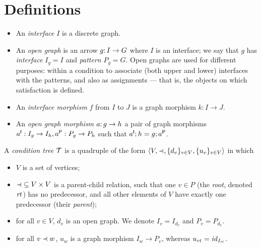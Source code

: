 \section{Definitions}
\label{sec:definitions}

\begin{itemize}
\item An \emph{interface} $I$ is a discrete graph.

\item An \emph{open graph} is an arrow $g{:}\, I\rightarrow G$ where $I$ is an interface; we say that $g$ has \emph{interface} $I_g=I$ and \emph{pattern} $P_g=G$. Open graphs are used for different purposes: within a condition to associate (both upper and lower) interfaces with the patterns, and also as assignments --- that is, the objects on which satisfaction is defined.

\item An \emph{interface morphism} $f$ from $I$ to $J$ is a graph morphism $k:I\to J$.

\item An \emph{open graph morphism} $a{:}\, g\rightarrow h$ a pair of graph morphisms $a^{\mathsf I}:I_g\rightarrow I_h, a^{\mathsf P}:P_g\rightarrow P_h$ such that $a^{\mathsf I};h=g;a^{\mathsf P}$.
\end{itemize}
%
\begin{definition}\label{def:condition tree}
A \emph{condition tree} ${\mathcal{T}}$ is a quadruple of the form $\tupof{V, {\parentof}, \setof{d_v}_{v\in V}, \setof{u_v}_{v\in V}}$ in which

\begin{itemize}[topsep=\itemsep]
\item $V$ is a set of vertices;

\item ${\parentof}\subseteq V\times V$ is a parent-child relation, such that one $v\in P$ (the \emph{root}, denoted $\mathit{rt}_{}$) has no predecessor, and all other elements of $V$ have exactly one predecessor (their \emph{parent});

\item for all $v\in V$, $d_v$ is an open graph. We denote $I_v=I_{d_v}$ and $P_v=P_{d_v}$.

\item for all $v\parentof w$, $u_w$ is a graph morphism $I_w\to P_v$, whereas $u_{\mathit{rt}_{}}={\mathit{id}}_{I_{\mathit{rt}_{}}}$.
\end{itemize}
\end{definition}
%
